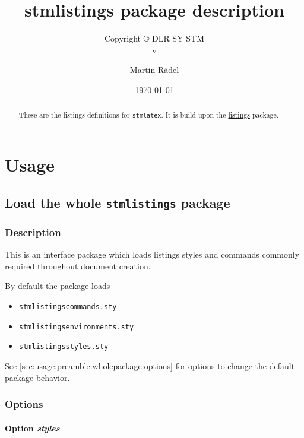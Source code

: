 \documentclass[%
  type=article,%
  layout=koma,%
  hyperref=true,%
  date=true,%
  listings=false,%
  tabular=true,%
]{stmtext}
\author{Martin R\"{a}del}
\title{stmlistings package description}
\subtitle{Copyright \copyright{} \the\year{} DLR SY STM\\v\formatdate[versiondatestyle]{\DTMToday}}
\date{\today}
\begin{document}
\maketitle

\begin{abstract}
These are the listings definitions for \texttt{stmlatex}. It is build upon the \href{https://ctan.org/pkg/listings}{listings} package.
\end{abstract}

\tableofcontents

\section{Usage}%

\subsection{Load the whole \protect\texttt{stmlistings} package}
\label{sec:usage:preamble:wholepackage}

\subsubsection{Description}
\label{sec:usage:preamble:wholepackage:description}

This is an interface package which loads listings styles and commands commonly required throughout document creation.

By default the package loads

\begin{itemize}[noitemsep]
  \item \verb+stmlistingscommands.sty+
  \item \verb+stmlistingsenvironments.sty+
  \item \verb+stmlistingsstyles.sty+
\end{itemize}

See \autoref{sec:usage:preamble:wholepackage:options} for options to change the default package behavior.

\subsubsection{Options}
\label{sec:usage:preamble:wholepackage:options}

\paragraph{Option \protect\textit{styles}} 
\label{sec:usage:preamble:wholepackage:options:styles}
\end{document}
